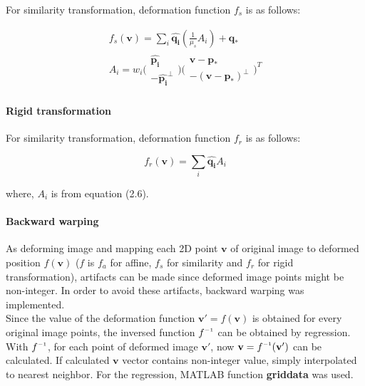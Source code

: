 \documentclass[paper=a4, fontsize=11pt]{scrartcl} %
\numberwithin{equation}{section} %
\numberwithin{figure}{section} %
\numberwithin{table}{section} %
\newcommand{\funcname}[1]{\textbf{#1}}
\newcommand{\inv}{^{\raisebox{.2ex}{$\scriptscriptstyle-1$}}}
\renewcommand{\vec}[1]{\mathbf{#1}}
\begin{document}
For similarity transformation, deformation function $f_s$ is as follows:

\begin{gather}
	f_s(\vec{v}) = \sum_i \hat{\vec{q_i}} (\frac{1}{\mu_s} A_i) + \vec{q_*} \\
	A_i = w_i \Bigg( 
	\begin{array}{c}
		\vec{\hat{p_i}} \\
		- \vec{\hat{p_i}}^\perp
	\end{array} \Bigg) \Bigg(
	\begin{array}{c}
		\vec{v} - \vec{p_*} \\
		- (\vec{v} - \vec{p_*})^\perp
	\end{array} \Bigg)^T
\end{gather}


\paragraph{Rigid transformation}

For similarity transformation, deformation function $f_r$ is as follows:

\begin{equation}
	f_r(\vec{v}) = \sum_i \hat{\vec{q_i}} A_i
\end{equation}

where, $A_i$ is from equation (2.6).

\paragraph{Backward warping}

As deforming image and mapping each 2D point $\vec{v}$ of original image to deformed position $f(\vec{v})$ ($f$ is $f_a$ for affine, $f_s$ for similarity and $f_r$ for rigid transformation), artifacts can be made since deformed image points might be non-integer. In order to avoid these artifacts, backward warping was implemented. \\

Since the value of the deformation function $\vec{v'} = f(\vec{v})$ is obtained for every original image points, the inversed function $f\inv$ can be obtained by regression. With $f\inv$, for each point of deformed image $\vec{v'}$, now $\vec{v} = f\inv(\vec{v'})$ can be calculated. If calculated $\vec{v}$ vector contains non-integer value, simply interpolated to nearest neighbor. For the regression, MATLAB function \funcname{griddata} was used.

\pagebreak
\end{document}
